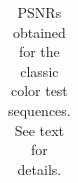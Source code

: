 \documentclass[10pt, journal, twocolumn, final, a4paper]{IEEEtran}
\newcommand{\bsic}[1]{\textcolor{black}{\textit{#1}}}
\newcommand{\Bsic}[1]{\textcolor{black}{\textbf{\textit{#1}}}}
\newcommand{\Best}[1]{\textbf{\textcolor{black}{#1}}}
\begin{document}
\begin{table}[htp!]
\begin{center}
{\begin{tabular}{ c | l |c c | c c | c c | c c | c c | c}
		\end{tabular}}
	\end{center}
	\caption{PSNRs obtained for the classic color test sequences. See text for
		details.}
	\label{tab:psnr-classic-color}
\end{table}
\end{document}
